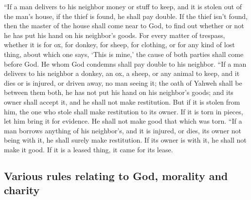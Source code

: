 \begin{paracol}{2}
\begin{otherlanguage}{english}
 ``If a man delivers to his neighbor money or stuff to
keep, and it is stolen out of the man's house, if the thief is found, he
shall pay double.  If the thief isn't found, then the
master of the house shall come near to God, to find out whether or not
he has put his hand on his neighbor's goods.  For every
matter of trespass, whether it is for ox, for donkey, for sheep, for
clothing, or for any kind of lost thing, about which one says, `This is
mine,' the cause of both parties shall come before God. He whom God
condemns shall pay double to his neighbor.  ``If a man
delivers to his neighbor a donkey, an ox, a sheep, or any animal to
keep, and it dies or is injured, or driven away, no man seeing it;
 the oath of Yahweh shall be between them both, he has
not put his hand on his neighbor's goods; and its owner shall accept it,
and he shall not make restitution.  But if it is stolen
from him, the one who stole shall make restitution to its owner.
 If it is torn in pieces, let him bring it for evidence.
He shall not make good that which was torn.  ``If a man
borrows anything of his neighbor's, and it is injured, or dies, its
owner not being with it, he shall surely make restitution.
 If its owner is with it, he shall not make it good. If
it is a leased thing, it came for its lease.

\hypertarget{various-rules-relating-to-god-morality-and-charity}{%
\subsection{Various rules relating to God, morality and
charity}\label{various-rules-relating-to-god-morality-and-charity}}


\end{otherlanguage}
\end{paracol}
